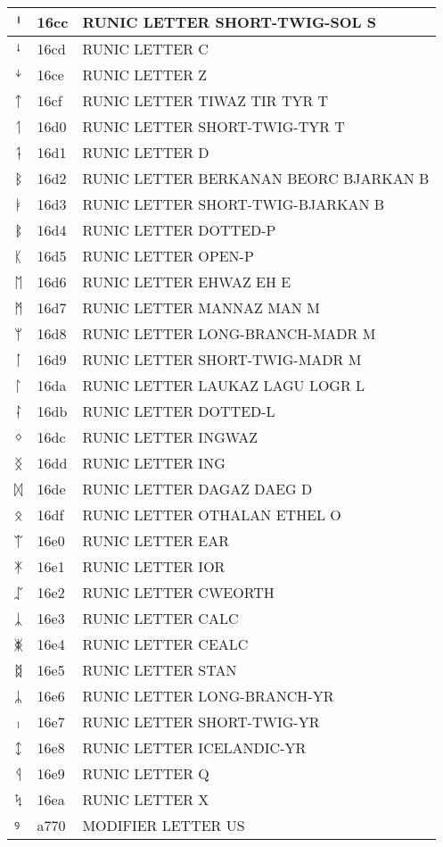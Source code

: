 \documentclass[12pt,letterpaper,openany]{book}
\begin{document}
\begin{center}
\begin{supertabular}{|m{0.25in}|m{0.5in}|m{4in}|}
ᛌ & 16cc & RUNIC LETTER SHORT-TWIG-SOL S\\\hline
ᛍ & 16cd & RUNIC LETTER C\\\hline
ᛎ & 16ce & RUNIC LETTER Z\\\hline
ᛏ & 16cf & RUNIC LETTER TIWAZ TIR TYR T\\\hline
ᛐ & 16d0 & RUNIC LETTER SHORT-TWIG-TYR T\\\hline
ᛑ & 16d1 & RUNIC LETTER D\\\hline
ᛒ & 16d2 & RUNIC LETTER BERKANAN BEORC BJARKAN B\\\hline
ᛓ & 16d3 & RUNIC LETTER SHORT-TWIG-BJARKAN B\\\hline
ᛔ & 16d4 & RUNIC LETTER DOTTED-P\\\hline
ᛕ & 16d5 & RUNIC LETTER OPEN-P\\\hline
ᛖ & 16d6 & RUNIC LETTER EHWAZ EH E\\\hline
ᛗ & 16d7 & RUNIC LETTER MANNAZ MAN M\\\hline
ᛘ & 16d8 & RUNIC LETTER LONG-BRANCH-MADR M\\\hline
ᛙ & 16d9 & RUNIC LETTER SHORT-TWIG-MADR M\\\hline
ᛚ & 16da & RUNIC LETTER LAUKAZ LAGU LOGR L\\\hline
ᛛ & 16db & RUNIC LETTER DOTTED-L\\\hline
ᛜ & 16dc & RUNIC LETTER INGWAZ\\\hline
ᛝ & 16dd & RUNIC LETTER ING\\\hline
ᛞ & 16de & RUNIC LETTER DAGAZ DAEG D\\\hline
ᛟ & 16df & RUNIC LETTER OTHALAN ETHEL O\\\hline
ᛠ & 16e0 & RUNIC LETTER EAR\\\hline
ᛡ & 16e1 & RUNIC LETTER IOR\\\hline
ᛢ & 16e2 & RUNIC LETTER CWEORTH\\\hline
ᛣ & 16e3 & RUNIC LETTER CALC\\\hline
ᛤ & 16e4 & RUNIC LETTER CEALC\\\hline
ᛥ & 16e5 & RUNIC LETTER STAN\\\hline
ᛦ & 16e6 & RUNIC LETTER LONG-BRANCH-YR\\\hline
ᛧ & 16e7 & RUNIC LETTER SHORT-TWIG-YR\\\hline
ᛨ & 16e8 & RUNIC LETTER ICELANDIC-YR\\\hline
ᛩ & 16e9 & RUNIC LETTER Q\\\hline
ᛪ & 16ea & RUNIC LETTER X\\\hline
ꝰ & a770 & MODIFIER LETTER US\\\hline

\end{supertabular}
\end{center}
\end{document}
